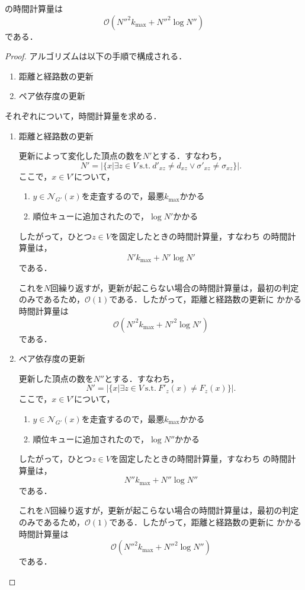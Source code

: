 \begin{theorem}
  の時間計算量は
  \[ \mathcal{O}(N''^2k_{\max}+N''^2\log N'') \]
  である．
\end{theorem}
\begin{proof}
  アルゴリズムは以下の手順で構成される．
  \begin{enumerate}[label=(\alph*)]
  \item 距離と経路数の更新
  \item ペア依存度の更新
  \end{enumerate}
  それぞれについて，時間計算量を求める．

  \begin{enumerate}[label=(\alph*)]
  \item 距離と経路数の更新
    \par 更新によって変化した頂点の数を$N'$とする．すなわち，
    \[ N'=\vert\{x|\exists z\in V\:\text{s.t.}\:d'_{xz}\neq d_{xz}\lor\sigma'_{xz}\neq\sigma_{xz}\}\vert. \]
    ここで，$x\in V'$について，
    \begin{enumerate}[label=\arabic*.]
    \item $y\in\mathcal{N}_{G'}(x)$を走査するので，最悪$k_{\max}$かかる
    \item 順位キューに追加されたので，$\log N'$かかる
    \end{enumerate}
    したがって，ひとつ$z\in V$を固定したときの時間計算量，すなわち
    の時間計算量は，
    \[ N'k_{\max}+N'\log N' \]
    である．
    \par これを$N$回繰り返すが，更新が起こらない場合の時間計算量は，最初の判定
    のみであるため，$\mathcal{O}(1)$である．したがって，距離と経路数の更新に
    かかる時間計算量は
    \[ \mathcal{O}(N'^2k_{\max}+N'^2\log N') \]
    である．
  \item ペア依存度の更新
    \par 更新した頂点の数を$N''$とする．すなわち，
    \[ N'=\vert\{x|\exists z\in V\:\text{s.t.}\:F'_{z}(x)\neq F_{z}(x)\}\vert. \]
    ここで，$x\in V'$について，
    \begin{enumerate}[label=\arabic*.]
    \item $y\in\mathcal{N}_{G'}(x)$を走査するので，最悪$k_{\max}$かかる
    \item 順位キューに追加されたので，$\log N''$かかる
    \end{enumerate}
    したがって，ひとつ$z\in V$を固定したときの時間計算量，すなわち
    の時間計算量は，
    \[ N''k_{\max}+N''\log N'' \]
    である．
    \par これを$N$回繰り返すが，更新が起こらない場合の時間計算量は，最初の判定
    のみであるため，$\mathcal{O}(1)$である．したがって，距離と経路数の更新に
    かかる時間計算量は
    \[ \mathcal{O}(N''^2k_{\max}+N''^2\log N'') \]
    である．
  \end{enumerate}


\end{proof}

